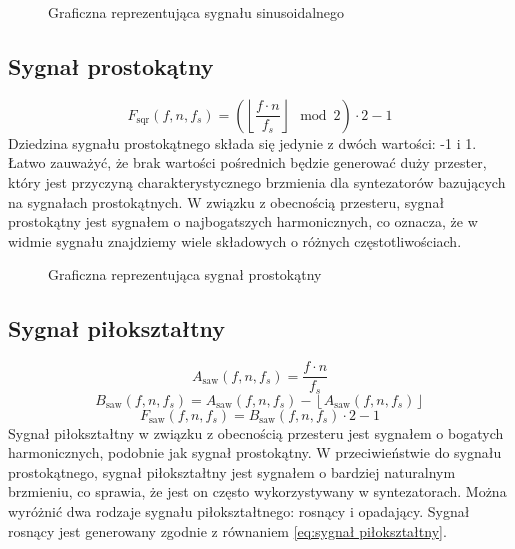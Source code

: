 \begin{figure}[H]
    \centering
    \scalebox{1.0}{}
    \caption{Graficzna reprezentująca sygnału sinusoidalnego}
    \label{fig:Graficzna reprezentująca sygnału sinusoidalego}
\end{figure}


\subsection{Sygnał prostokątny}
\newcommand{\Fsquare}{F_{\text{sqr}}}
\begin{equation}
    \Fsquare(f, n, f_s) = \left(\left\lfloor \frac{f \cdot n}{f_s} \right\rfloor \mod 2\right) \cdot 2 - 1
    \label{eq:sygnał prostokątny}
\end{equation}
Dziedzina sygnału prostokątnego składa się jedynie z dwóch wartości: -1 i 1. Łatwo zauważyć, że brak wartości pośrednich będzie generować duży przester, który jest przyczyną charakterystycznego brzmienia dla syntezatorów bazujących na sygnałach prostokątnych. W związku z obecnością przesteru, sygnał prostokątny jest sygnałem o najbogatszych harmonicznych, co oznacza, że w widmie sygnału znajdziemy wiele składowych o różnych częstotliwościach.

\begin{figure}[H]
    \centering
    \scalebox{1.0}{}
    \caption{Graficzna reprezentująca sygnał prostokątny}
    \label{fig:Graficzna reprezentująca sygnał prostokątny}
\end{figure}


\subsection{Sygnał piłokształtny}
\newcommand{\Fsaw}{F_{\text{saw}}}
\newcommand{\Asaw}{A_{\text{saw}}}
\newcommand{\Bsaw}{B_{\text{saw}}}

\begin{equation}
    \Asaw(f, n, f_s) = \frac{f \cdot n}{f_s}
    \label{eq:sygnał piłokształtny a}
\end{equation}
\begin{equation}
    \Bsaw(f, n, f_s) = \Asaw(f, n, f_s) - \left\lfloor \Asaw(f, n, f_s) \right\rfloor
    \label{eq:sygnał piłokształtny b}
\end{equation}
\begin{equation}
    \Fsaw(f, n, f_s) = \Bsaw(f, n, f_s) \cdot 2 - 1
    \label{eq:sygnał piłokształtny}
\end{equation}
Sygnał piłokształtny w związku z obecnością przesteru jest sygnałem o bogatych harmonicznych, podobnie jak sygnał prostokątny. W przeciwieństwie do sygnału prostokątnego, sygnał piłokształtny jest sygnałem o bardziej naturalnym brzmieniu, co sprawia, że jest on często wykorzystywany w syntezatorach. Można wyróżnić dwa rodzaje sygnału piłokształtnego: rosnący i opadający. Sygnał rosnący jest generowany zgodnie z równaniem \ref{eq:sygnał piłokształtny}.

